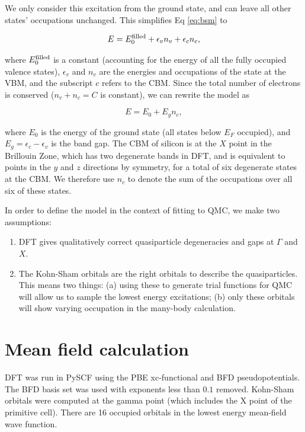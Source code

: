 We only consider this excitation from the ground state, and can leave all other states' occupations unchanged.
This simplifies Eq \ref{eq:bsm} to

\begin{equation}
E = E_0^{\rm filled} + \epsilon_v n_v + \epsilon_c n_c,
\end{equation}

where $E_0^{\rm filled}$ is a constant (accounting for the energy of all the fully occupied valence states), $\epsilon_v$ and $n_v$ are the energies and occupations of the state at the VBM, and the subscript $c$ refers to the CBM.
Since the total number of electrons is conserved ($n_v + n_c = C$ is constant), we can rewrite the model as

\begin{equation}\label{eq:bandgapmodel}
E = E_0 + E_g n_c,
\end{equation}

where $E_0$ is the energy of the ground state (all states below $E_F$ occupied), and $E_g = \epsilon_c - \epsilon_v$ is the band gap.
The CBM of silicon is at the $X$ point in the Brillouin Zone, which has two degenerate bands in DFT, and is equivalent to points in the $y$ and $z$ directions by symmetry, for a total of six degenerate states at the CBM.
We therefore use $n_c$ to denote the sum of the occupations over all six of these states.

In order to define the model in the context of fitting to QMC, we make two assumptions:

\begin{enumerate}
\item DFT gives qualitatively correct quasiparticle degeneracies and gaps at $\Gamma$ and $X$.
\item The Kohn-Sham orbitals are the right orbitals to describe the quasiparticles.
This means two things: 
(a) using these to generate trial functions for QMC will allow us to sample the lowest energy excitations; 
(b) only these orbitals will show varying occupation in the many-body calculation.
\end{enumerate}

\section{Mean field calculation}

DFT was run in PySCF using the PBE xc-functional and BFD pseudopotentials.
The BFD basis set was used with exponents less than $0.1$ removed.
Kohn-Sham orbitals were computed at the gamma point (which includes the X point of the primitive cell).
There are 16 occupied orbitals in the lowest energy mean-field wave function.


